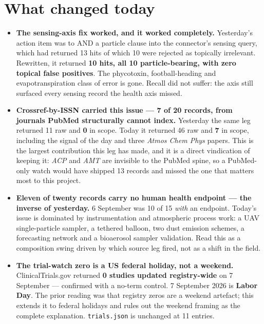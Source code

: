 \documentclass[10pt]{article}
\begin{document}
\section*{\sffamily\bfseries\color{Deep}What changed today}
\vspace{-1.5mm}{\color{Amber}\rule{\linewidth}{1.1pt}}\vspace{2.5mm}

\footnotesize
\begin{itemize}
\item \textbf{The sensing-axis fix worked, and it worked completely.} Yesterday's action item
was to AND a particle clause into the connector's sensing query, which had returned 13 hits
of which 10 were rejected as topically irrelevant. Rewritten, it returned \textbf{10 hits,
all 10 particle-bearing, with zero topical false positives}. The phycotoxin, football-heading
and evapotranspiration class of error is gone. Recall did not suffer: the axis still
surfaced every sensing record the health axis missed.

\item \textbf{Crossref-by-ISSN carried this issue --- 7 of 20 records, from journals PubMed
structurally cannot index.} Yesterday the same leg returned 11 raw and \textbf{0} in scope.
Today it returned 46 raw and \textbf{7} in scope, including the signal of the day and three
\textit{Atmos Chem Phys} papers. This is the largest contribution this leg has made, and it
is a direct vindication of keeping it: \textit{ACP} and \textit{AMT} are invisible to the
PubMed spine, so a PubMed-only watch would have shipped 13 records and missed the one that
matters most to this project.

\item \textbf{Eleven of twenty records carry no human health endpoint --- the inverse of
yesterday.} 6 September was 10 of 15 \emph{with} an endpoint. Today's issue is dominated by
instrumentation and atmospheric process work: a UAV single-particle sampler, a tethered
balloon, two dust emission schemes, a forecasting network and a bioaerosol sampler
validation. Read this as a composition swing driven by which source leg fired, not as a
shift in the field.

\item \textbf{The trial-watch zero is a US federal holiday, not a weekend.} ClinicalTrials.gov
returned \textbf{0 studies updated registry-wide} on 7 September --- confirmed with a no-term
control. 7 September 2026 is \textbf{Labor Day}. The prior reading was that registry zeros are
a weekend artefact; this extends it to federal holidays and rules out the weekend framing as
the complete explanation. \texttt{trials.json} is unchanged at 11 entries.


\end{itemize}
\end{document}
